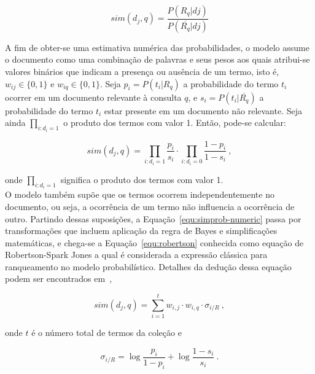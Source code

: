 \begin{equation}
	sim(d_j, q) = \frac{P(R_q|dj)}{P(\overline{R_q}|dj)} 
	\label{equ:simprob}
\end{equation}


A fim de obter-se uma estimativa numérica das probabilidades, o modelo assume o documento como uma combinação de palavras e seus pesos aos quais atribui-se valores binários que indicam a presença ou ausência de um termo, isto é, $w_{ij} \in \{0,1\}$ e $w_{iq} \in \{0,1\}$. Seja $p_i = P(t_i|R_q)$ a probabilidade do termo $t_i$ ocorrer em um documento relevante à consulta $q$, e $s_i    = P(t_i|\overline{R_q})$ a probabilidade do termo $t_i$ estar presente em um documento não relevante. 
Seja ainda $\prod_{i:d_i=1}$ o produto dos termos com valor 1. 
Então, pode-se calcular:

\begin{equation}
	sim(d_j, q) = 	
	\prod_{i:d_i=1} \frac{p_i}{s_i} 
	\cdot
	\prod_{i:d_i=0} \frac{1 - p_i}{1 - s_i}~,
	\label{equ:simprob-numeric}
\end{equation}


\noindent
onde $\prod_{i:d_i=1}$ significa o produto dos termos com valor 1.\\


%
%
O modelo também supõe que os termos ocorrem independentemente no documento, ou seja, a ocorrência de um termo não influencia a ocorrência de outro. 
Partindo dessas suposições, a Equação~\ref{equ:simprob-numeric} passa por transformações que incluem aplicação da regra de Bayes e simplificações matemáticas, e chega-se a Equação~\ref{equ:robertson} conhecida como equação de Robertson-Spark Jones a qual é considerada a expressão clássica para ranqueamento no modelo probabilístico. Detalhes da dedução dessa equação podem ser encontrados em~\cite{Croft2009, Manning2008, Rijsbergen1979},



\begin{equation}
	sim(d_j,q) = \sum_{i=1}^{t} w_{i,j} \cdot w_{i,q}  \cdot \sigma_{i/R}~,
	\label{equ:robertson}
\end{equation}



\noindent
onde $t$ é o número total de termos da coleção e 



\begin{equation}
	\sigma_{i/R} = \log \frac{p_i}{1-p_i} + \log \frac{1-s_i}{s_i}~.
\end{equation} 


